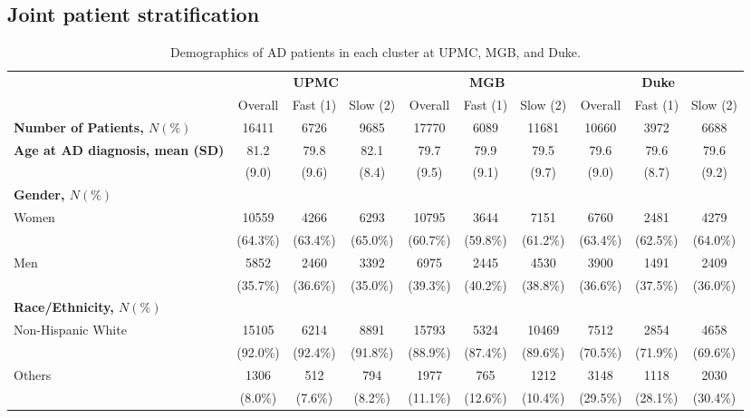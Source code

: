 \documentclass{article}
\begin{document}
\subsection{Joint patient stratification}
\begin{table}[H]
    \centering
    \scriptsize
    \begin{tabular}{l c c c c c c c c c}
\toprule
& \multicolumn{3}{c}{\textbf{UPMC}}&
\multicolumn{3}{c}{\textbf{MGB}}&
\multicolumn{3}{c}{\textbf{Duke}} \\
\cmidrule(r){2-4}\cmidrule(l){5-7}\cmidrule(l){8-10}
& Overall & Fast (1) & Slow (2) & Overall & Fast (1) & Slow (2) & Overall & Fast (1) & Slow (2)  \\
\bottomrule
\textbf{Number of Patients, $N(\%)$} & 16411 & 6726 & 9685 &  17770 & 6089 & 11681 & 10660 & 3972 & 6688 \\
\bottomrule
\textbf{Age at AD diagnosis, mean (SD)} & 81.2 & 79.8 & 82.1 & 79.7 & 79.9 & 79.5 & 79.6 & 79.6 & 79.6 \\
 & (9.0) & (9.6) & (8.4) & (9.5) & (9.1) & (9.7) & (9.0) & (8.7) & (9.2)\\
\bottomrule
\textbf{Gender, $N(\%)$}\\
Women & 10559  & 4266  & 6293 & 10795 & 3644 & 7151 & 6760 & 2481 & 4279 \\
 & (64.3\%) & (63.4\%) & (65.0\%) & (60.7\%) & (59.8\%) & (61.2\%) & (63.4\%) & (62.5\%) & (64.0\%) \\
Men & 5852 & 2460 & 3392 & 6975 & 2445 & 4530 & 3900 & 1491 & 2409 \\
 & (35.7\%) & (36.6\%) & (35.0\%) & (39.3\%) & (40.2\%) & (38.8\%) & (36.6\%) & (37.5\%) & (36.0\%) \\
\bottomrule
\textbf{Race/Ethnicity, $N(\%)$} \\
Non-Hispanic White & 15105 & 6214 & 8891 & 15793 & 5324 & 10469 & 7512 & 2854 & 4658 \\
 & (92.0\%) & (92.4\%) & (91.8\%) & (88.9\%) & (87.4\%) & (89.6\%) & (70.5\%) & (71.9\%) & (69.6\%) \\
Others & 1306 & 512 & 794 & 1977 & 765 & 1212 & 3148 & 1118 & 2030 \\
 & (8.0\%) & (7.6\%) & (8.2\%) & (11.1\%) & (12.6\%) & (10.4\%) & (29.5\%) & (28.1\%) & (30.4\%) \\
\bottomrule
\end{tabular}
\caption{Demographics of AD patients in each cluster at UPMC, MGB, and Duke.}
\label{tab:AD_demo}
\end{table}
\end{document}

